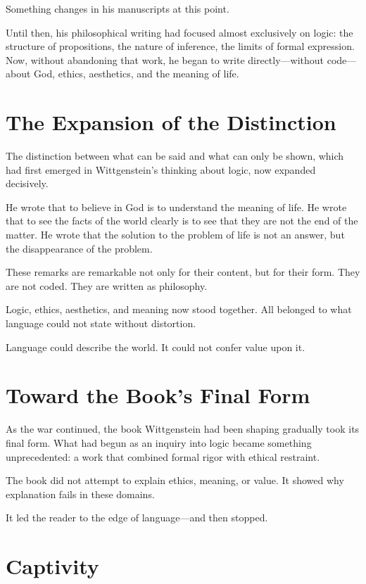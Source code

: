 \documentclass[11pt]{article}
\begin{document}
Something changes in his manuscripts at this point.

Until then, his philosophical writing had focused almost exclusively on logic: the structure of propositions, the nature of inference, the limits of formal expression. Now, without abandoning that work, he began to write directly—without code—about God, ethics, aesthetics, and the meaning of life.

\section*{The Expansion of the Distinction}

The distinction between what can be said and what can only be shown, which had first emerged in Wittgenstein’s thinking about logic, now expanded decisively.

He wrote that to believe in God is to understand the meaning of life. He wrote that to see the facts of the world clearly is to see that they are not the end of the matter. He wrote that the solution to the problem of life is not an answer, but the disappearance of the problem.

These remarks are remarkable not only for their content, but for their form. They are not coded. They are written as philosophy.

Logic, ethics, aesthetics, and meaning now stood together. All belonged to what language could not state without distortion.

Language could describe the world.  
It could not confer value upon it.

\section*{Toward the Book’s Final Form}

As the war continued, the book Wittgenstein had been shaping gradually took its final form. What had begun as an inquiry into logic became something unprecedented: a work that combined formal rigor with ethical restraint.

The book did not attempt to explain ethics, meaning, or value. It showed why explanation fails in these domains.

It led the reader to the edge of language—and then stopped.

\section*{Captivity}
\end{document}
